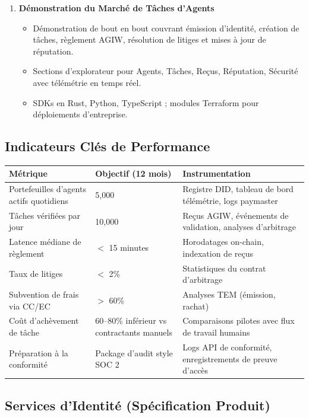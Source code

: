 \documentclass[11pt]{article}
\begin{document}
\begin{enumerate}[label=\textbf{D\arabic*.}, leftmargin=*]
  \item \textbf{Démonstration du Marché de Tâches d'Agents}
  \begin{itemize}[noitemsep]
    \item Démonstration de bout en bout couvrant émission d'identité, création de tâches, règlement AGIW, résolution de litiges et mises à jour de réputation.
    \item Sections d'explorateur pour Agents, Tâches, Reçus, Réputation, Sécurité avec télémétrie en temps réel.
    \item SDKs en Rust, Python, TypeScript ; modules Terraform pour déploiements d'entreprise.
  \end{itemize}
\end{enumerate}

\subsection{Indicateurs Clés de Performance}
\begin{longtable}{@{}p{}p{}p{}@{}}
\toprule
\textbf{Métrique} & \textbf{Objectif (12 mois)} & \textbf{Instrumentation} \\\midrule
Portefeuilles d'agents actifs quotidiens & 5,000 & Registre DID, tableau de bord télémétrie, logs paymaster \\
Tâches vérifiées par jour & 10,000 & Reçus AGIW, événements de validation, analyses d'arbitrage \\
Latence médiane de règlement & $<$ 15 minutes & Horodatages on-chain, indexation de reçus \\
Taux de litiges & $<$ 2\% & Statistiques du contrat d'arbitrage \\
Subvention de frais via CC/EC & $>$ 60\% & Analyses TEM (émission, rachat) \\
Coût d'achèvement de tâche & 60--80\% inférieur vs contractants manuels & Comparaisons pilotes avec flux de travail humains \\
Préparation à la conformité & Package d'audit style SOC 2 & Logs API de conformité, enregistrements de preuve d'accès \\
\bottomrule
\end{longtable}

\subsection{Services d'Identité (Spécification Produit)}
\label{sec:identity-spec}
\end{document}
